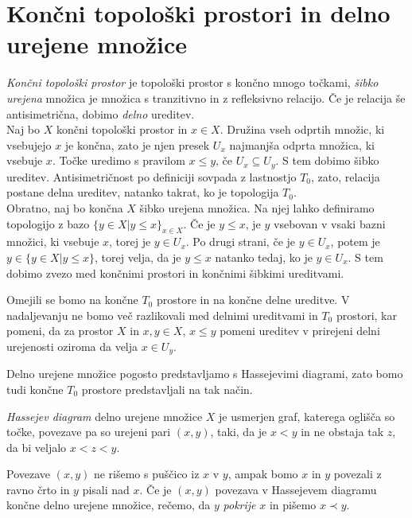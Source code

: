 \documentclass[mat1]{fmfdelo}
\begin{document}
\section{Končni topološki prostori in delno urejene množice}
\label{sec:delne}

\textit{Končni topološki prostor} je topološki prostor s končno mnogo točkami, 
\textit{šibko urejena} množica je množica s tranzitivno in z refleksivno relacijo. Če je relacija še antisimetrična, dobimo \textit{delno} ureditev.
\\ \indent Naj bo $X$ končni topološki prostor in $x \in X$. Družina vseh odprtih množic, ki vsebujejo $x$ je končna, zato je njen presek $U_x$ najmanjša odprta množica, ki vsebuje $x$.
    Točke uredimo s pravilom $ x\le y \text{, če } U_x \subseteq  U_y$. S tem dobimo šibko ureditev. 
    Antisimetričnost po definiciji sovpada z lastnostjo $T_0$, zato, relacija postane delna ureditev,
     natanko takrat, ko je topologija $T_0$.
    \\ \indent Obratno, naj bo končna $X$ šibko urejena množica. Na njej lahko definiramo topologijo z bazo $\{y \in X | y\le x\}_{x \in X}$. Če je
$y \le x$, je $y$ vsebovan v vsaki bazni množici, ki vsebuje $x$, torej je $y \in U_x$. Po drugi strani, če je $y\in
U_x$, potem je $y \in \{y \in X | y \le x\}$, torej velja, da je $y \le x$ natanko tedaj, ko je $y \in U_x$. S tem dobimo zvezo med končnimi prostori in končnimi šibkimi ureditvami. %

Omejili se bomo na končne $T_0$ prostore in na končne delne ureditve. V nadaljevanju ne bomo več razlikovali med delnimi ureditvami in $T_0$ prostori, kar pomeni, da za prostor $X$ in $x,y\in X$, $x\leq y$ pomeni ureditev v prirejeni delni urejenosti oziroma da velja $x\in U_y$. 

Delno urejene množice pogosto predstavljamo s Hassejevimi diagrami, zato bomo tudi končne $T_0$ prostore predstavljali na tak način.

\begin{definicija}
    \textit{Hassejev diagram} delno urejene množice $X$ je usmerjen graf, katerega oglišča so točke, povezave pa so urejeni pari $(x,y)$, taki, da je  $x<y$ in ne obstaja tak $z$, da bi veljalo $x<z<y$.
\end{definicija}

Povezave $(x,y)$ ne rišemo s puščico iz $x$ v $y$, ampak bomo $x$ in $y$ povezali z ravno črto in $y$ pisali nad $x$. Če je $(x,y)$ povezava v Hassejevem diagramu končne delno urejene množice, rečemo, da $y$ \textit{pokrije} $x$ in pišemo $x\prec y$.
\end{document}

